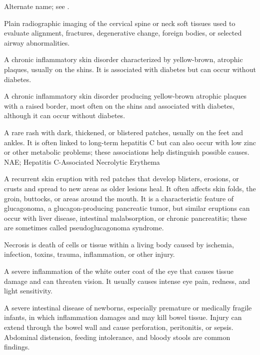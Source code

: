  Alternate name; see .

 Plain radiographic imaging of the cervical spine or neck soft tissues used to evaluate alignment, fractures, degenerative change, foreign bodies, or selected airway abnormalities.

 A chronic inflammatory skin disorder characterized by yellow-brown, atrophic plaques,
usually on the shins. It is associated with diabetes but can occur without diabetes.

 A chronic inflammatory skin disorder producing yellow-brown atrophic plaques with a raised border, most often on the shins and associated with diabetes, although it can occur without diabetes.

 A rare rash with dark, thickened, or blistered patches, usually on the feet and ankles. It is often linked to long-term hepatitis C but can also occur with low zinc or other metabolic problems; these associations help distinguish possible causes.
\synonyms
NAE; Hepatitis C-Associated Necrolytic Erythema

 A recurrent skin eruption with red patches that develop blisters, erosions, or crusts and spread to new areas as older lesions heal. It often affects skin folds, the groin, buttocks, or areas around the mouth. It is a characteristic feature of glucagonoma, a glucagon-producing pancreatic tumor, but similar eruptions can occur with liver disease, intestinal malabsorption, or chronic pancreatitis; these are sometimes called pseudoglucagonoma syndrome.

 Necrosis is death of cells or tissue within a living body caused by ischemia, infection, toxins, trauma, inflammation, or other injury.

 A severe inflammation of the white outer coat of the eye that causes tissue damage and can threaten vision. It usually causes intense eye pain, redness, and light sensitivity.

 A severe intestinal disease of newborns, especially
premature or medically fragile infants, in which inflammation damages and may kill bowel
tissue. Injury can extend through the bowel wall and cause perforation, peritonitis, or
sepsis. Abdominal distension, feeding intolerance, and bloody stools are common findings.

